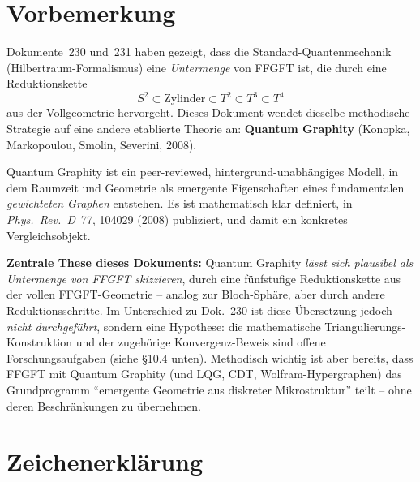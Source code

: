 
\section*{Vorbemerkung}

Dokumente~230 und~231 haben gezeigt, dass die Standard-Quantenmechanik
(Hilbertraum-Formalismus) eine \emph{Untermenge} von FFGFT ist, die
durch eine Reduktionskette
\[
S^2 \subset \text{Zylinder} \subset T^2 \subset T^3 \subset T^4
\]
aus der Vollgeometrie hervorgeht. Dieses Dokument wendet dieselbe
methodische Strategie auf eine andere etablierte Theorie an:
\textbf{Quantum Graphity} (Konopka, Markopoulou, Smolin, Severini,
2008).

Quantum Graphity ist ein peer-reviewed, hintergrund-unabhängiges
Modell, in dem Raumzeit und Geometrie als emergente Eigenschaften
eines fundamentalen \emph{gewichteten Graphen} entstehen. Es ist
mathematisch klar definiert, in \emph{Phys.~Rev.~D}~77, 104029 (2008)
publiziert, und damit ein konkretes Vergleichsobjekt.

\textbf{Zentrale These dieses Dokuments:} Quantum Graphity \emph{lässt
sich plausibel als Untermenge von FFGFT skizzieren}, durch eine
fünfstufige Reduktionskette aus der vollen FFGFT-Geometrie -- analog
zur Bloch-Sphäre, aber durch andere Reduktionsschritte. Im Unterschied
zu Dok.~230 ist diese Übersetzung jedoch \emph{nicht durchgeführt},
sondern eine Hypothese: die mathematische Triangulierungs-Konstruktion
und der zugehörige Konvergenz-Beweis sind offene Forschungsaufgaben
(siehe §10.4 unten). Methodisch wichtig ist aber bereits, dass FFGFT
mit Quantum Graphity (und LQG, CDT, Wolfram-Hypergraphen) das
Grundprogramm \enquote{emergente Geometrie aus diskreter Mikrostruktur}
teilt -- ohne deren Beschränkungen zu übernehmen.

\section*{Zeichenerklärung}

